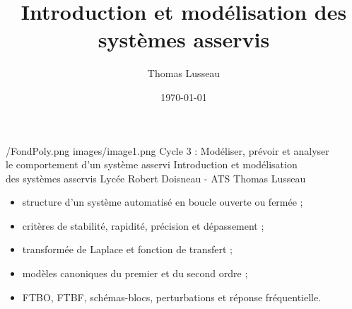 
\titlehead{Thomas Lusseau - SII en ATS}
\title[Systèmes asservis]{Introduction et modélisation des systèmes asservis}
\author[TL]{Thomas Lusseau}
\date{\today}

\TLCourseCoverSetup
  {\repStyle/FondPoly.png}
  {images/image1.png}
  {Cycle 3 : Modéliser, prévoir et analyser\\ le comportement d'un système asservi}
  {Introduction et modélisation\\ des systèmes asservis}
  {Lycée Robert Doisneau - ATS}
  {Thomas Lusseau}


\TLCourseFooter
\TLCourseCover
{}

\livrettrue
\collefalse


\begin{savoirs}
\begin{itemize}
  \item structure d'un système automatisé en boucle ouverte ou fermée ;
  \item critères de stabilité, rapidité, précision et dépassement ;
  \item transformée de Laplace et fonction de transfert ;
  \item modèles canoniques du premier et du second ordre ;
  \item FTBO, FTBF, schémas-blocs, perturbations et réponse fréquentielle.
\end{itemize}
\end{savoirs}


